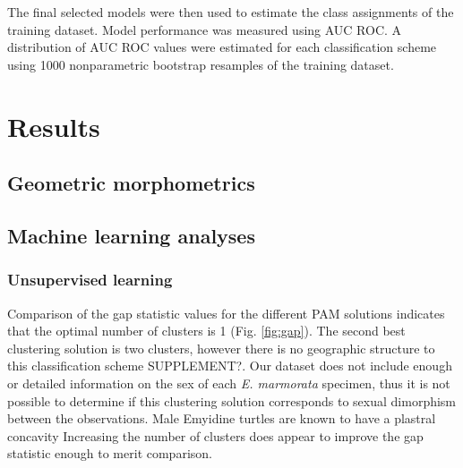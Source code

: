 \documentclass[12pt]{article}\usepackage{graphicx, color}
\begin{document}
The final selected models were then used to estimate the class assignments of the training dataset. Model performance was measured using AUC ROC. A distribution of AUC ROC values were estimated for each classification scheme using 1000 nonparametric bootstrap resamples of the training dataset.

\section{Results}
\subsection{Geometric morphometrics}

\subsection{Machine learning analyses}
\subsubsection{Unsupervised learning}

Comparison of the gap statistic values for the different PAM solutions indicates that the optimal number of clusters is 1 (Fig. \ref{fig:gap}). The second best clustering solution is two clusters, however there is no geographic structure to this classification scheme SUPPLEMENT?. Our dataset does not include enough or detailed information on the sex of each \textit{E. marmorata} specimen, thus it is not possible to determine if this clustering solution corresponds to sexual dimorphism between the observations. Male Emyidine turtles are known to have a plastral concavity
Increasing the number of clusters does appear to improve the gap statistic enough to merit comparison. 
\end{document}
